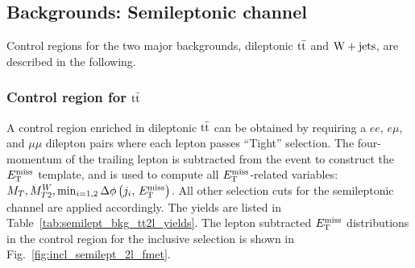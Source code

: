 \subsection{Backgrounds: Semileptonic channel}
\label{subsec:bkg_semilept}

Control regions for the two major backgrounds, dileptonic $\mathrm{t}\bar{\mathrm{t}}$ and $\mathrm{W+jets}$, are described in the following.

\subsubsection{Control region for \texorpdfstring{$\mathrm{t}\bar{\mathrm{t}}$}{ttbar}}
\label{subsubsec:bkg_semilept_ttbar}

A control region enriched in dileptonic $\mathrm{t}\bar{\mathrm{t}}$ can be obtained by requiring a $ee$, $e\mu$, and $\mu\mu$ dilepton pairs where each lepton passes ``Tight'' selection. The four-momentum of the trailing lepton is subtracted from the event to construct the $E_\mathrm{T}^{\mathrm{miss}}$ template, and is used to compute all $E_\mathrm{T}^{\mathrm{miss}}$-related variables: $M_T, M_{T2}^W, \min_{i=1,2}\Delta\phi\left(j_i,\,E_\mathrm{T}^{\mathrm{miss}}\right)$. All other selection cuts for the semileptonic channel are applied accordingly. The yields are listed in Table~\ref{tab:semilept_bkg_tt2l_yields}. The lepton subtracted $E_\mathrm{T}^{\mathrm{miss}}$ distributions in the control region for the inclusive selection is shown in Fig.~\ref{fig:incl_semilept_2l_fmet}.

